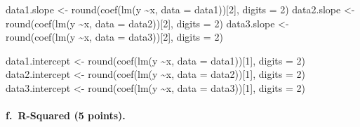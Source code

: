 \documentclass[
]{article}
\newenvironment{Shaded}{\begin{snugshade}}{\end{snugshade}}
\newcommand{\AttributeTok}[1]{\textcolor[rgb]{0.77,0.63,0.00}{#1}}
\newcommand{\DecValTok}[1]{\textcolor[rgb]{0.00,0.00,0.81}{#1}}
\newcommand{\FunctionTok}[1]{\textcolor[rgb]{0.00,0.00,0.00}{#1}}
\newcommand{\NormalTok}[1]{#1}
\newcommand{\OtherTok}[1]{\textcolor[rgb]{0.56,0.35,0.01}{#1}}
\newcommand{\SpecialCharTok}[1]{\textcolor[rgb]{0.00,0.00,0.00}{#1}}
\begin{document}
\begin{Shaded}
\begin{Highlighting}[]
\NormalTok{data1.slope }\OtherTok{\textless{}{-}} \FunctionTok{round}\NormalTok{(}\FunctionTok{coef}\NormalTok{(}\FunctionTok{lm}\NormalTok{(y }\SpecialCharTok{\textasciitilde{}}\NormalTok{x, }\AttributeTok{data =}\NormalTok{ data1))[}\DecValTok{2}\NormalTok{], }\AttributeTok{digits =} \DecValTok{2}\NormalTok{)}
\NormalTok{data2.slope }\OtherTok{\textless{}{-}} \FunctionTok{round}\NormalTok{(}\FunctionTok{coef}\NormalTok{(}\FunctionTok{lm}\NormalTok{(y }\SpecialCharTok{\textasciitilde{}}\NormalTok{x, }\AttributeTok{data =}\NormalTok{ data2))[}\DecValTok{2}\NormalTok{], }\AttributeTok{digits =} \DecValTok{2}\NormalTok{)}
\NormalTok{data3.slope }\OtherTok{\textless{}{-}} \FunctionTok{round}\NormalTok{(}\FunctionTok{coef}\NormalTok{(}\FunctionTok{lm}\NormalTok{(y }\SpecialCharTok{\textasciitilde{}}\NormalTok{x, }\AttributeTok{data =}\NormalTok{ data3))[}\DecValTok{2}\NormalTok{], }\AttributeTok{digits =} \DecValTok{2}\NormalTok{)}

\NormalTok{data1.intercept }\OtherTok{\textless{}{-}} \FunctionTok{round}\NormalTok{(}\FunctionTok{coef}\NormalTok{(}\FunctionTok{lm}\NormalTok{(y }\SpecialCharTok{\textasciitilde{}}\NormalTok{x, }\AttributeTok{data =}\NormalTok{ data1))[}\DecValTok{1}\NormalTok{], }\AttributeTok{digits =} \DecValTok{2}\NormalTok{)}
\NormalTok{data2.intercept }\OtherTok{\textless{}{-}} \FunctionTok{round}\NormalTok{(}\FunctionTok{coef}\NormalTok{(}\FunctionTok{lm}\NormalTok{(y }\SpecialCharTok{\textasciitilde{}}\NormalTok{x, }\AttributeTok{data =}\NormalTok{ data2))[}\DecValTok{1}\NormalTok{], }\AttributeTok{digits =} \DecValTok{2}\NormalTok{)}
\NormalTok{data3.intercept }\OtherTok{\textless{}{-}} \FunctionTok{round}\NormalTok{(}\FunctionTok{coef}\NormalTok{(}\FunctionTok{lm}\NormalTok{(y }\SpecialCharTok{\textasciitilde{}}\NormalTok{x, }\AttributeTok{data =}\NormalTok{ data3))[}\DecValTok{1}\NormalTok{], }\AttributeTok{digits =} \DecValTok{2}\NormalTok{)}
\end{Highlighting}
\end{Shaded}

\hypertarget{f.-r-squared-5-points.}{%
\paragraph{f.~R-Squared (5 points).}\label{f.-r-squared-5-points.}}
\end{document}
